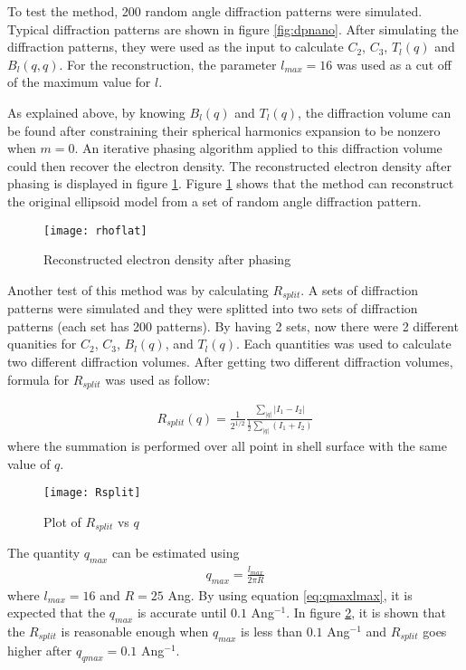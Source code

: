 To test the method, 200 random angle diffraction patterns were simulated. Typical diffraction patterns are shown in figure \ref{fig:dpnano}.  After simulating the diffraction patterns, they were used as the input to calculate $C_{2}$, $C_{3}$, $T_{l}(q)$ and $B_{l}(q,q)$. For the reconstruction, the parameter $l_{max}=16$ was used as a cut off of the maximum value for $l$.  

As explained above, by knowing $B_{l}(q)$ and $T_{l}(q)$, the diffraction volume can be found after constraining their spherical harmonics expansion to be nonzero when $m=0$. An iterative phasing algorithm \cite{oszlanyi2004, oszlanyi2005} applied to this diffraction volume could then recover the electron density. The reconstructed electron density after phasing is displayed in figure \ref{fig:rhoflat}. Figure \ref{fig:rhoflat} shows that the method can reconstruct the original ellipsoid model from a set of random angle diffraction pattern. 

\begin{figure}[h!]
\centering
 \texttt{[image: rhoflat]}
\caption{Reconstructed electron density after phasing}
\label{fig:rhoflat}
\end{figure}

Another test of this method was by calculating $R_{split}$. A sets of diffraction patterns were simulated and they were splitted into two sets of diffraction patterns (each set has 200 patterns). By having 2 sets, now there were 2 different quanities for $C_{2}$, $C_{3}$, $B_{l}(q)$, and $T_{l}(q)$. Each quantities was used to calculate two different diffraction volumes. After getting two different diffraction volumes, formula for $ R_{split} $ was used as follow:

\begin{align}
R_{split}(q)=\frac{1}{2^{1/2}}\frac{\sum_{|q|} |I_{1} - I_{2}|}{\frac{1}{2} \sum_{|q|}(I_{1}+I_{2})} 
\end{align} 
where the summation is performed over all point in shell surface with the same value of $q$. 

\begin{figure}[h!]
\centering
 \texttt{[image: Rsplit]}
\caption{Plot of $R_{split}$ vs $q$}
\label{fig:Rsplit}
\end{figure}

The quantity $q_{max}$ can be estimated using 
\begin{align}
q_{max}=\frac{l_{max}}{2 \pi R}
\label{eq:qmaxlmax}
\end{align}
where $l_{max}=16$ and $R=25$ Ang. By using equation \ref{eq:qmaxlmax}, it is expected that the $q_{max}$ is accurate until $0.1$ Ang$^{-1}$. In figure \ref{fig:Rsplit}, it is shown that the $R_{split}$ is reasonable enough when $q_{max}$ is less than $0.1$ Ang$^{-1}$ and $R_{split}$ goes higher after $q_{qmax}=0.1$ Ang$^{-1}$.  

